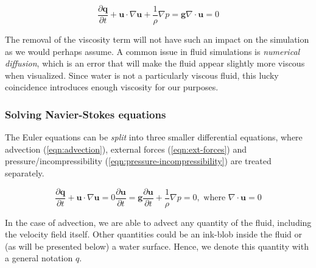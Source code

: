 \documentclass[twocolumn]{article}
\begin{document}
\begin{subequations}
\begin{equation}
    \frac{\partial \mathbf{q}}{\partial t} + \mathbf{u} \cdot \nabla \mathbf{u} + \frac{1}{\rho} \nabla p = \mathbf{g}
\label{eqn:euler-de}
\end{equation}
\begin{equation}
    \nabla \cdot \mathbf{u} = 0
\label{eqn:euler-incompressibility}
\end{equation}
\label{eqn:euler}
\end{subequations}

The removal of the viscosity term will not have such an impact on the simulation as we would perhaps assume. A common issue in fluid simulations is \emph{numerical diffusion}, which is an error that will make the fluid appear slightly more viscous when visualized. Since water is not a particularly viscous fluid, this lucky coincidence introduces enough viscosity for our purposes.

\subsubsection{Solving Navier-Stokes equations}
The Euler equations can be \emph{split} into three smaller differential equations, where advection (\ref{eqn:advection}), external forces (\ref{eqn:ext-forces}) and pressure/incompressibility (\ref{eqn:pressure-incompressibility}) are treated separately. 

\begin{subequations}
  \begin{equation}
    \frac{\partial \mathbf{q}}{\partial t} + \mathbf{u} \cdot \nabla \mathbf{u} = 0
  \label{eqn:advection}
  \end{equation}
  \begin{equation}
    \frac{\partial \mathbf{u}}{\partial t} = \mathbf{g}
  \label{eqn:ext-forces}
  \end{equation}
  \begin{equation}
    \frac{\partial \mathbf{u}}{\partial t} + \frac{1}{\rho} \nabla p = 0, \mbox{}
    \text{ where } \nabla \cdot \mathbf{u} = 0
  \label{eqn:pressure-incompressibility}
  \end{equation}
\label{eqn:equler-split}
\end{subequations}

In the case of advection, we are able to advect any quantity of the fluid, including the velocity field itself. Other quantities could be an ink-blob inside the fluid or (as will be presented below) a water surface. Hence, we denote this quantity with a general notation $q$.
\end{document}
